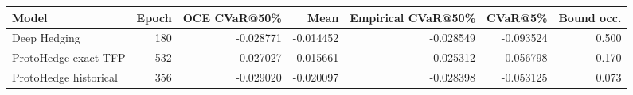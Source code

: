 \begin{tabular}{lrrrrrr}
\toprule
Model & Epoch & OCE CVaR@50\% & Mean & Empirical CVaR@50\% & CVaR@5\% & Bound occ. \\
\midrule
Deep Hedging & 180 & -0.028771 & -0.014452 & -0.028549 & -0.093524 & 0.500 \\
ProtoHedge exact TFP & 532 & -0.027027 & -0.015661 & -0.025312 & -0.056798 & 0.170 \\
ProtoHedge historical & 356 & -0.029020 & -0.020097 & -0.028398 & -0.053125 & 0.073 \\
\bottomrule
\end{tabular}
